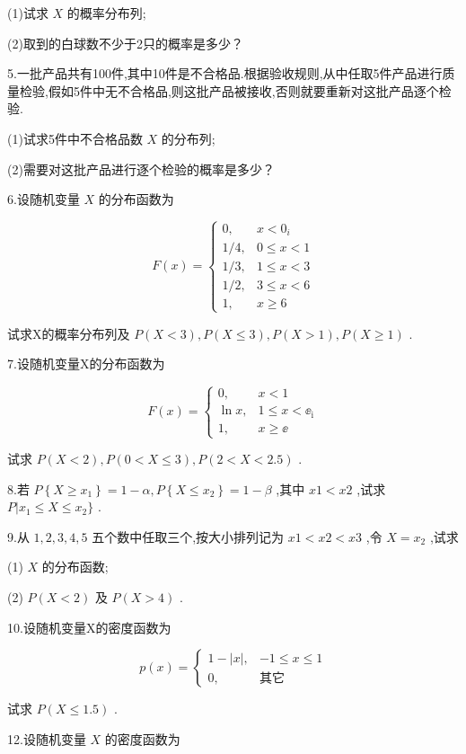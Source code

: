 (1)试求 $ X $ 的概率分布列;

(2)取到的白球数不少于2只的概率是多少？

5.一批产品共有100件,其中10件是不合格品.根据验收规则,从中任取5件产品进行质量检验,假如5件中无不合格品,则这批产品被接收,否则就要重新对这批产品逐个检验.

(1)试求5件中不合格品数 $ X $ 的分布列;

(2)需要对这批产品进行逐个检验的概率是多少？

6.设随机变量 $ X $ 的分布函数为

\[ 
F(x)=\left\{\begin{array}{ll}
{0,} & {x<0_{i}} \\ {1 / 4,} & {0 \leqslant x<1} \\ 
{1 / 3,} & {1 \leqslant x<3} \\ {1 / 2,} & {3 \leqslant x<6} \\ 
{1,} & {x \geqslant 6}
\end{array}\right.
\]

试求X的概率分布列及 $ P(X<3), P(X \leqslant 3), P(X>1), P(X \geqslant 1) $ .

7.设随机变量X的分布函数为

\[ 
F(x)=\left\{\begin{array}{ll}
{0,} & {x<1} \\ {\ln x,} & {1 \leqslant x<\ee _{\mathrm{i}}} \\ 
{1,} & {x \geqslant \ee }
\end{array}\right.
\]

试求 $ P(X<2), P(0<X \leqslant 3), P(2<X<2.5) $ .

8.若 $ P\left\{X \geqslant x_{1}\right\}=1-\alpha, P\left\{X \leqslant x_{2}\right\}=1-\beta $ ,其中 $ x1<x2 $ ,试求 $ P | x_{1} \leqslant X \leqslant x_{2} \} $ .

9.从 $ 1,2,3,4,5 $ 五个数中任取三个,按大小排列记为 $ x1<x2<x3 $ ,令 $ X=x_2 $ ,试求

(1) $ X $ 的分布函数;

(2) $ P(X<2) $ 及 $ P(X>4) $ .

10.设随机变量X的密度函数为

\[ 
p(x)=\left\{\begin{array}{ll}
{1-|x|,} & {-1 \leqslant x \leqslant 1} \\ 
{0,} & {\text{其它}}
\end{array}\right.
\]

试求 $ P(X≤1.5) $ .

12.设随机变量 $ X $ 的密度函数为

